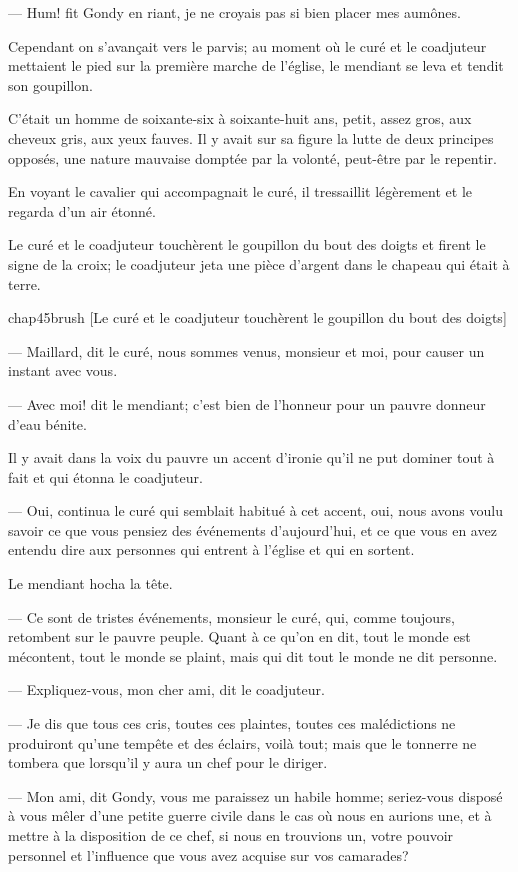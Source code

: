 — Hum! fit Gondy en riant, je ne croyais pas si bien placer mes aumônes.

Cependant on s'avançait vers le parvis; au moment où le curé et le coadjuteur mettaient le pied sur la première marche de l'église, le mendiant se leva et tendit son goupillon.

C'était un homme de soixante-six à soixante-huit ans, petit, assez gros, aux cheveux gris, aux yeux fauves. Il y avait sur sa figure la lutte de deux principes opposés, une nature mauvaise domptée par la volonté, peut-être par le repentir.

En voyant le cavalier qui accompagnait le curé, il tressaillit légèrement et le regarda d'un air étonné.

Le curé et le coadjuteur touchèrent le goupillon du bout des doigts et firent le signe de la croix; le coadjuteur jeta une pièce d'argent dans le chapeau qui était à terre.

\begin{bwbigpic}
	[\basicscale] 
	{chap45brush}
	[Le curé et le coadjuteur touchèrent le goupillon du bout des doigts]
\end{bwbigpic}

— Maillard, dit le curé, nous sommes venus, monsieur et moi, pour causer un instant avec vous.

— Avec moi! dit le mendiant; c'est bien de l'honneur pour un pauvre donneur d'eau bénite.

Il y avait dans la voix du pauvre un accent d'ironie qu'il ne put dominer tout à fait et qui étonna le coadjuteur.

— Oui, continua le curé qui semblait habitué à cet accent, oui, nous avons voulu savoir ce que vous pensiez des événements d'aujourd'hui, et ce que vous en avez entendu dire aux personnes qui entrent à l'église et qui en sortent.

Le mendiant hocha la tête.

— Ce sont de tristes événements, monsieur le curé, qui, comme toujours, retombent sur le pauvre peuple. Quant à ce qu'on en dit, tout le monde est mécontent, tout le monde se plaint, mais qui dit tout le monde ne dit personne.

— Expliquez-vous, mon cher ami, dit le coadjuteur.

— Je dis que tous ces cris, toutes ces plaintes, toutes ces malédictions ne produiront qu'une tempête et des éclairs, voilà tout; mais que le tonnerre ne tombera que lorsqu'il y aura un chef pour le diriger.

— Mon ami, dit Gondy, vous me paraissez un habile homme; seriez-vous disposé à vous mêler d'une petite guerre civile dans le cas où nous en aurions une, et à mettre à la disposition de ce chef, si nous en trouvions un, votre pouvoir personnel et l'influence que vous avez acquise sur vos camarades?

